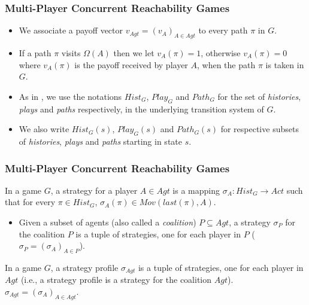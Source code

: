 \documentclass{beamer}
\begin{document}
\begin{frame}
\frametitle{Multi-Player Concurrent Reachability Games}
\begin{itemize}
\item We associate a payoff vector $v_{Agt} = (v_{A})_{A\in Agt}$ to every path $\pi$ in $G$.
\item If a path $\pi$ visits $\Omega (A)$ then we let $v_{A}(\pi) = 1$, otherwise $v_{A}(\pi) = 0$ where $v_{A}(\pi)$ is the payoff received by player $A$, when the path $\pi$ is taken in $G$.
\item As in \cite{BBM-concur10,BBM-report}, we use the notations $Hist_{G}$, $Play_{G}$ and $Path_{G}$ for the set of \textit{histories}, \textit{plays} and \textit{paths} respectively, in the underlying transition system of $G$.
\item We also write $Hist_{G}(s)$, $Play_{G}(s)$ and $Path_{G}(s)$ for respective subsets of \textit{histories}, \textit{plays} and \textit{paths} starting in state $s$.
\end{itemize}
\end{frame}

\begin{frame}
\frametitle{Multi-Player Concurrent Reachability Games}
\begin{definition}[Strategy]
In a game $G$, a strategy for a player $A \in Agt$ is a mapping $\sigma_{A}: Hist_{G} \rightarrow Act$ such that for every $\pi \in Hist_{G}$, $\sigma_{A}(\pi) \in Mov(last(\pi), A)$.
\end{definition}
\begin{itemize}
\item Given a subset of agents (also called a \textit{coalition}) $P \subseteq Agt$, a strategy $\sigma_{P}$ for the coalition $P$ is a tuple of strategies, one for each player in $P$ ($\sigma_{P} = (\sigma_{A})_{A\in P}$).
\end{itemize}
\begin{definition}
In a game $G$, a strategy profile $\sigma_{Agt}$ is a tuple of strategies, one for each player in $Agt$ (i.e., a strategy profile is a strategy for the coalition $Agt$). $\sigma_{Agt} = (\sigma_{A})_{A\in Agt}$.
\end{definition}
\end{frame}
\end{document}
